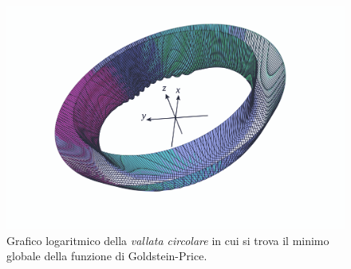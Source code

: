 \begin{figure}[h!]
	\centering
	\includegraphics[width=1\linewidth, trim={5cm 5cm 5cm 1cm}, clip]{Immagini/GoldsteinLog.pdf}
	\caption{Grafico logaritmico della \emph{vallata circolare} in cui si trova il minimo globale della funzione di Goldstein-Price.}
	\label{fig:GoldsteinLog}
\end{figure}

\vfill

